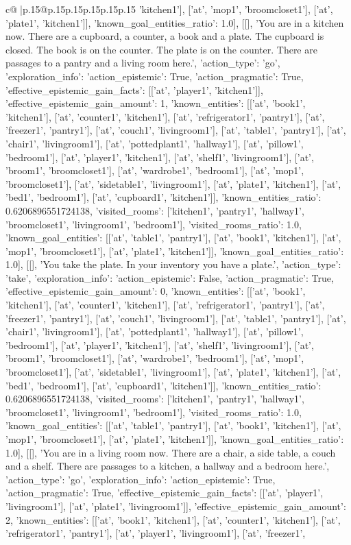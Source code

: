 \documentclass{article}
\begin{document}
{\begin{supertabular}{c@{$\;$}|p{.15\linewidth}@{}p{.15\linewidth}p{.15\linewidth}p{.15\linewidth}p{.15\linewidth}p{.15\linewidth}}
{{{'kitchen1'], ['at', 'mop1', 'broomcloset1'], ['at', 'plate1', 'kitchen1']], 'known_goal_entities_ratio': 1.0}}], [[], 'You are in a kitchen now. There are a cupboard, a counter, a book and a plate. The cupboard is closed. The book is on the counter. The plate is on the counter. There are passages to a pantry and a living room here.', {'action_type': 'go', 'exploration_info': {'action_epistemic': True, 'action_pragmatic': True, 'effective_epistemic_gain_facts': [['at', 'player1', 'kitchen1']], 'effective_epistemic_gain_amount': 1, 'known_entities': [['at', 'book1', 'kitchen1'], ['at', 'counter1', 'kitchen1'], ['at', 'refrigerator1', 'pantry1'], ['at', 'freezer1', 'pantry1'], ['at', 'couch1', 'livingroom1'], ['at', 'table1', 'pantry1'], ['at', 'chair1', 'livingroom1'], ['at', 'pottedplant1', 'hallway1'], ['at', 'pillow1', 'bedroom1'], ['at', 'player1', 'kitchen1'], ['at', 'shelf1', 'livingroom1'], ['at', 'broom1', 'broomcloset1'], ['at', 'wardrobe1', 'bedroom1'], ['at', 'mop1', 'broomcloset1'], ['at', 'sidetable1', 'livingroom1'], ['at', 'plate1', 'kitchen1'], ['at', 'bed1', 'bedroom1'], ['at', 'cupboard1', 'kitchen1']], 'known_entities_ratio': 0.6206896551724138, 'visited_rooms': ['kitchen1', 'pantry1', 'hallway1', 'broomcloset1', 'livingroom1', 'bedroom1'], 'visited_rooms_ratio': 1.0, 'known_goal_entities': [['at', 'table1', 'pantry1'], ['at', 'book1', 'kitchen1'], ['at', 'mop1', 'broomcloset1'], ['at', 'plate1', 'kitchen1']], 'known_goal_entities_ratio': 1.0}}], [[], 'You take the plate. In your inventory you have a plate.', {'action_type': 'take', 'exploration_info': {'action_epistemic': False, 'action_pragmatic': True, 'effective_epistemic_gain_amount': 0, 'known_entities': [['at', 'book1', 'kitchen1'], ['at', 'counter1', 'kitchen1'], ['at', 'refrigerator1', 'pantry1'], ['at', 'freezer1', 'pantry1'], ['at', 'couch1', 'livingroom1'], ['at', 'table1', 'pantry1'], ['at', 'chair1', 'livingroom1'], ['at', 'pottedplant1', 'hallway1'], ['at', 'pillow1', 'bedroom1'], ['at', 'player1', 'kitchen1'], ['at', 'shelf1', 'livingroom1'], ['at', 'broom1', 'broomcloset1'], ['at', 'wardrobe1', 'bedroom1'], ['at', 'mop1', 'broomcloset1'], ['at', 'sidetable1', 'livingroom1'], ['at', 'plate1', 'kitchen1'], ['at', 'bed1', 'bedroom1'], ['at', 'cupboard1', 'kitchen1']], 'known_entities_ratio': 0.6206896551724138, 'visited_rooms': ['kitchen1', 'pantry1', 'hallway1', 'broomcloset1', 'livingroom1', 'bedroom1'], 'visited_rooms_ratio': 1.0, 'known_goal_entities': [['at', 'table1', 'pantry1'], ['at', 'book1', 'kitchen1'], ['at', 'mop1', 'broomcloset1'], ['at', 'plate1', 'kitchen1']], 'known_goal_entities_ratio': 1.0}}], [[], 'You are in a living room now. There are a chair, a side table, a couch and a shelf. There are passages to a kitchen, a hallway and a bedroom here.', {'action_type': 'go', 'exploration_info': {'action_epistemic': True, 'action_pragmatic': True, 'effective_epistemic_gain_facts': [['at', 'player1', 'livingroom1'], ['at', 'plate1', 'livingroom1']], 'effective_epistemic_gain_amount': 2, 'known_entities': [['at', 'book1', 'kitchen1'], ['at', 'counter1', 'kitchen1'], ['at', 'refrigerator1', 'pantry1'], ['at', 'player1', 'livingroom1'], ['at', 'freezer1', }}}
\end{supertabular}}
\end{document}
